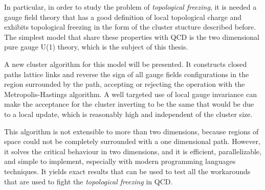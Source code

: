 In particular, in order to study the problem of \emph{topological freezing},
it is needed a gauge field theory that has a good definition of local topological charge and exhibits topological freezing in the form of the cluster stucture described before.
The simplest model that share these properties with QCD is the two dimensional pure gauge U(1) theory, which is the subject of this thesis.

A new cluster algorithm for this model will be presented.
It constructs closed paths lattice links and reverse the sign of all gauge fields configurations in the region surrounded by the path,
accepting or rejecting the operation with the Metropolis-Hastings algorithm.
A well targeted use of local gauge invariance can make the acceptance for the cluster inverting to be the same that would be due to a local update,
which is reasonably high%
and independent of the cluster size.

This algorithm is not extensible to more than two dimensions,
because regions of space could not be completely surrounded with a one dimensional path.
However, it solves the critical behaviour in two dimensions, and it is efficient, parallelizable, and simple to implement, especially with modern programming languages techniques.
It yields exact results that can be used to test all the workarounds that are used to fight the \emph{topological freezing} in QCD. 

